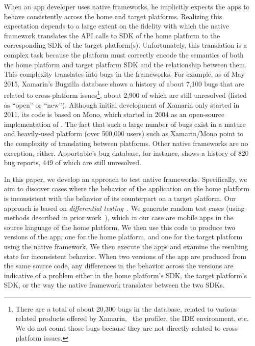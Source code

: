 When an app developer uses native frameworks, he implicitly expects the apps to
behave consistently across the home and target platforms. Realizing this
expectation depends to a large extent on the fidelity with which the native
framework translates the API calls to SDK of the home platform to the
corresponding SDK of the target platform(s). Unfortunately, this translation is
a complex task because the platform must correctly encode the semantics of both
the home platform and target platform SDK and the relationship between them.
This complexity translates into bugs in the frameworks. For example, as of May
2015, Xamarin's Bugzilla database shows a history of about 7,100 bugs that are
related to cross-platform issues\footnote{There are a total of about
20,300 bugs in the database, related to various related products offered by
Xamarin, \eg~the profiler, the IDE environment, etc. We do not count those bugs
because they are not directly related to cross-platform issues.}, about 2,900
of which are still unresolved (listed as ``open'' or ``new''). Although initial
development of Xamarin only started in 2011, its code is based on Mono, which
started in 2004 as an open-source implementation of .  The fact that
such a large number of bugs exist in a mature and heavily-used platform (over
500,000 users) such as Xamarin/Mono point to the complexity of translating
between platforms. Other native frameworks are no exception, either.
Apportable's bug database, for instance, shows a history of 820 bug reports,
449 of which are still unresolved.


In this paper, we develop an approach to test native frameworks. Specifically,
we aim to discover cases where the behavior of the application on the home
platform is inconsistent with the behavior of its counterpart on a target
platform. Our approach is based on \textit{differential
testing}~\cite{mckeeman:difftest:1998}. We generate random test cases (using
methods described in prior work~\cite{randoop:icse07}), which in our case are
mobile apps in the source language of the home platform. We then use this code
to produce two versions of the app, one for the home platform, and one for the
target platform using the native framework. We then execute the apps and
examine the resulting state for inconsistent behavior.  When two versions of
the app are produced from the same source code, any differences in the behavior
across the versions are indicative of a problem either in the home platform's
SDK, the target platform's SDK, or the way the native framework translates
between the two SDKs.

